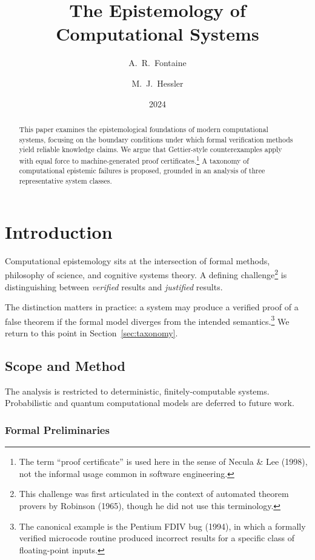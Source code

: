 \documentclass[twocolumn,12pt]{article}
\title{The Epistemology of Computational Systems}
\author{A.~R.~Fontaine \and M.~J.~Hessler}
\date{2024}
\begin{document}
\maketitle

\begin{abstract}
This paper examines the epistemological foundations of modern computational
systems, focusing on the boundary conditions under which formal verification
methods yield reliable knowledge claims.
We argue that Gettier-style counterexamples apply with equal force to
machine-generated proof certificates.\footnote{The term ``proof certificate''
is used here in the sense of Necula \& Lee (1998), not the informal
usage common in software engineering.}
A taxonomy of computational epistemic failures is proposed, grounded in
an analysis of three representative system classes.
\end{abstract}

\section{Introduction}
\label{sec:intro}

Computational epistemology sits at the intersection of formal methods,
philosophy of science, and cognitive systems theory.
\lipsum[1]
A defining challenge\footnote{This challenge was first articulated in the
context of automated theorem provers by Robinson (1965), though he did not
use this terminology.} is distinguishing between \emph{verified} results
and \emph{justified} results.

\lipsum[2]

The distinction matters in practice: a system may produce a verified proof
of a false theorem if the formal model diverges from the intended
semantics.\footnote{The canonical example is the Pentium FDIV bug (1994),
in which a formally verified microcode routine produced incorrect results
for a specific class of floating-point inputs.} We return to this point
in Section~\ref{sec:taxonomy}.

\subsection{Scope and Method}
\label{sec:scope}

The analysis is restricted to deterministic, finitely-computable systems.
Probabilistic and quantum computational models are deferred to future work.
\lipsum[3]

\subsubsection{Formal Preliminaries}
\label{sec:prelim}
\end{document}
